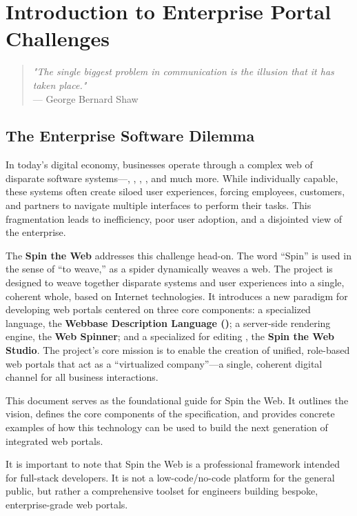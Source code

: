 
\chapter{Introduction to Enterprise Portal Challenges}
\label{chap:intro}

\begin{quote}
\textit{"The single biggest problem in communication is the illusion that it has taken place."} \\
— George Bernard Shaw
\end{quote}

\section{The Enterprise Software Dilemma}
\label{sec:enterprise-dilemma}

In today's digital economy, businesses operate through a complex web of disparate software systems—, , , , and much more. While individually capable, these systems often create siloed user experiences, forcing employees, customers, and partners to navigate multiple interfaces to perform their tasks. This fragmentation leads to inefficiency, poor user adoption, and a disjointed view of the enterprise.

The \textbf{Spin the Web} addresses this challenge head-on. The word ``Spin'' is used in the sense of ``to weave,'' as a spider dynamically weaves a web. The project is designed to weave together disparate systems and user experiences into a single, coherent whole, based on Internet technologies. It introduces a new paradigm for developing web portals centered on three core components: a specialized language, the \textbf{Webbase Description Language (\wbdl{})}; a server-side rendering engine, the \textbf{Web Spinner}; and a specialized \webbaselet{} for editing , the \textbf{Spin the Web Studio}. The project's core mission is to enable the creation of unified, role-based web portals that act as a ``virtualized company''—a single, coherent digital channel for all business interactions.

This document serves as the foundational guide for Spin the Web. It outlines the vision, defines the core components of the \wbdl{} specification, and provides concrete examples of how this technology can be used to build the next generation of integrated web portals.

It is important to note that Spin the Web is a professional framework intended for full-stack developers. It is not a low-code/no-code platform for the general public, but rather a comprehensive toolset for engineers building bespoke, enterprise-grade web portals.

